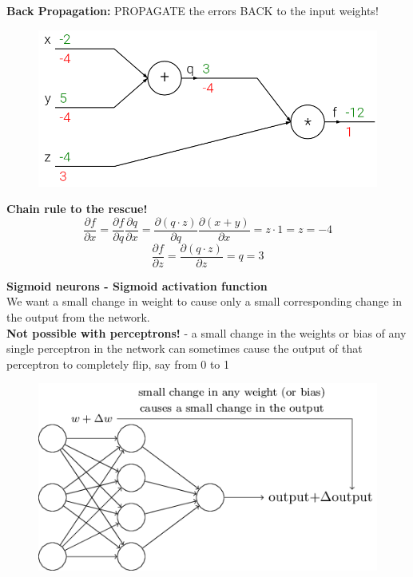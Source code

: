 \documentclass[10pt, compress]{beamer}
\begin{document}
\begin{frame}
  \vspace{1cm}
  \textbf{Back Propagation:} PROPAGATE the errors BACK to the input weights! \\
  \begin{figure}
    \includegraphics[width=.7\linewidth]{imgs/backprop_1}
  \end{figure}
  \textbf{Chain rule to the rescue!} \\
  $$\frac{\partial f}{\partial x} = \frac{\partial f}{\partial q} \frac{\partial q}{\partial x} =  \frac{\partial (q \cdot z)}{\partial q} \frac{\partial (x + y)}{\partial x} =
  z \cdot 1 = z = -4$$
  $$\frac{\partial f}{\partial z} = \frac{\partial (q \cdot z)}{\partial z} = q = 3$$
\end{frame}

\begin{frame}
  \vspace{0.6cm}
  \textbf{Sigmoid neurons - Sigmoid activation function} \\
  We want a small change in weight to cause only a small corresponding change in the output from the network. \\
  \textbf{Not possible with perceptrons!} - a small change in the weights or bias of any single perceptron in the network can sometimes cause the output of that perceptron to completely flip, say from 0 to 1
  \begin{figure}
    \includegraphics[width=.7\linewidth]{imgs/sigmoid_1}
  \end{figure}
\end{frame}
\end{document}
